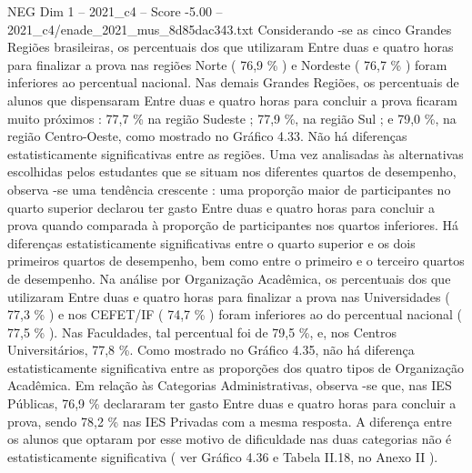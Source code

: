 \begin{textsample}{NEG Dim 1 – 2021\_c4 – Score -5.00 – 2021\_c4/enade\_2021\_mus\_8d85dac343.txt}
Considerando -se as cinco Grandes Regiões brasileiras, os percentuais dos que utilizaram Entre duas e quatro horas para finalizar a prova nas regiões Norte ( 76,9 \% ) e Nordeste ( 76,7 \% ) foram inferiores ao percentual nacional.
Nas demais Grandes Regiões, os percentuais de alunos que dispensaram Entre duas e quatro horas para concluir a prova ficaram muito próximos : 77,7 \% na região Sudeste ; 77,9 \%, na região Sul ; e 79,0 \%, na região Centro-Oeste, como mostrado no Gráfico 4.33.
Não há diferenças estatisticamente significativas entre as regiões.
Uma vez analisadas às alternativas escolhidas pelos estudantes que se situam nos diferentes quartos de desempenho, observa -se uma tendência crescente : uma proporção maior de participantes no quarto superior declarou ter gasto Entre duas e quatro horas para concluir a prova quando comparada à proporção de participantes nos quartos inferiores.
Há diferenças estatisticamente significativas entre o quarto superior e os dois primeiros quartos de desempenho, bem como entre o primeiro e o terceiro quartos de desempenho.
Na análise por Organização Acadêmica, os percentuais dos que utilizaram Entre duas e quatro horas para finalizar a prova nas Universidades ( 77,3 \% ) e nos CEFET/IF ( 74,7 \% ) foram inferiores ao do percentual nacional ( 77,5 \% ).
Nas Faculdades, tal percentual foi de 79,5 \%, e, nos Centros Universitários, 77,8 \%.
Como mostrado no Gráfico 4.35, não há diferença estatisticamente significativa entre as proporções dos quatro tipos de Organização Acadêmica.
Em relação às Categorias Administrativas, observa -se que, nas IES Públicas, 76,9 \% declararam ter gasto Entre duas e quatro horas para concluir a prova, sendo 78,2 \% nas IES Privadas com a mesma resposta.
A diferença entre os alunos que optaram por esse motivo de dificuldade nas duas categorias não é estatisticamente significativa ( ver Gráfico 4.36 e Tabela II.18, no Anexo II ).

\end{textsample}
